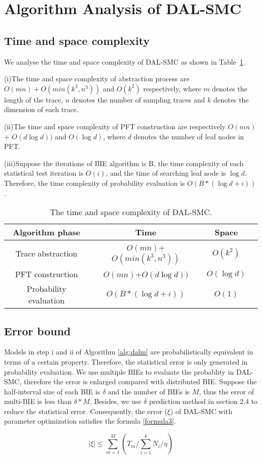 \section{Algorithm Analysis of DAL-SMC}

\subsection{Time and space complexity}
We analyse the time and space complexity of DAL-SMC as shown in Table~\ref{tb:complexity}.

(i)The time and space complexity of abstraction process are $O(mn)+O(min(k^3,n^3))$ and $O(k^2)$ respectively, where $m$ denotes the length of the trace, $n$ denotes the number of sampling traces and $k$ denotes the dimension of each trace.

(ii)The time and space complexity of PFT construction are respectively $O(mn)$ + $O(d\log{d}))$ and $O(\log{d})$, where $d$ denotes the number of leaf nodes in PFT.

(iii)Suppose the iterations of BIE algorithm is B, the time complexity of each statistical test iteration is $O(i)$, and the time of searching leaf node is $\log{d}$. Therefore, the time complexity of probability evaluation is $O(B*(\log{d}+i))$.

\begin{table}[t]
	\renewcommand{\arraystretch}{1.2}
	\caption{The time and space complexity of DAL-SMC.}
	\label{tb:complexity}
	\centering
	\begin{tabular}{c c c c}
		\hline
		Algorithm phase & Time  & Space\\
		\hline
		Trace abstraction &$O(mn)$+$O(min(k^3,n^3))$& $O(k^2)$ \\ 
		PFT construction &$O(mn)$+$O(d\log{d}))$& $O(\log{d})$ \\
		Probability evaluation &$O(B*(\log{d}+i))$& $O(1)$\\
		\hline
	\end{tabular}
\end{table}

\subsection{Error bound}
Models in step i and ii of Algorithm \ref{alg:dalm} are probabilistically equivalent in terms of a certain property. Therefore, the statistical error is only generated in probability evaluation. We use multiple BIEs to evaluate the probablity in DAL-SMC, therefore the error is enlarged compared with distributed BIE. Suppose the half-interval size of each BIE is $\delta$ and the number of BIEs is $M$, thus the error of multi-BIE is less than $\delta*M$. Besides, we use $\delta$ prediction method in section 2.4 to reduce the statistical error. Consequently, the error ($\xi$) of DAL-SMC with parameter optimization satisfies the formula \ref{formula3}.

\begin{equation}
\label{formula3}
| \xi | \leq \sum\limits_{m=1}^M (T_m / \sum\limits_{i=1}^k N_i / \eta)
\end{equation}